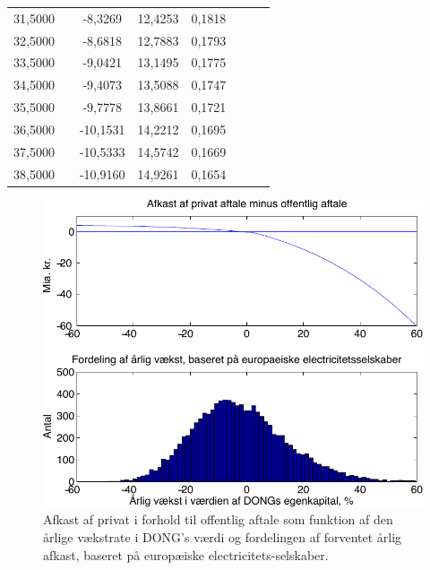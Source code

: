 \documentclass{article}
\begin{document}
\begin{table}[h]
\begin{center}
\begin{tabular}{cXcccccr}
31{,}5000&&-8{,}3269&12{,}4253& 0{,}1818\\
32{,}5000&&-8{,}6818&12{,}7883& 0{,}1793\\
33{,}5000&&-9{,}0421&13{,}1495& 0{,}1775\\
34{,}5000&&-9{,}4073&13{,}5088& 0{,}1747\\
35{,}5000&&-9{,}7778&13{,}8661& 0{,}1721\\
36{,}5000&&-10{,}1531&14{,}2212& 0{,}1695\\
37{,}5000&&-10{,}5333&14{,}5742& 0{,}1669\\
38{,}5000&&-10{,}9160&14{,}9261& 0{,}1654\\
		\bottomrule[1pt]
	\end{tabular}
\end{center}
\end{table}


\begin{figure}
\centerline{\includegraphics[scale=0.8]{../matlab/figs/afkast_hist_combine_elec_guan}}
\caption{Afkast af privat i forhold til offentlig aftale som funktion af den årlige v\ae{}kstrate i DONG's v\ae{}rdi og fordelingen af forventet \aa{}rlig afkast, baseret p\aa{} europ\ae{}iske electricitets-selskaber.}
\label{fig:combine1}
\end{figure}
\end{document}
